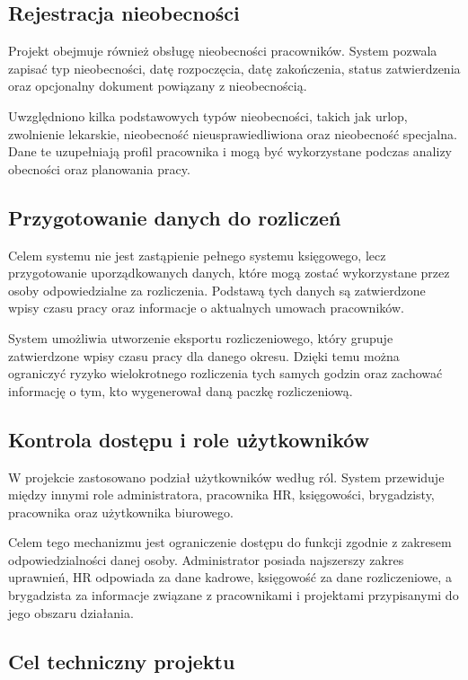 \subsection{Rejestracja nieobecności}

Projekt obejmuje również obsługę nieobecności pracowników. System pozwala zapisać typ nieobecności, datę rozpoczęcia, datę zakończenia, status zatwierdzenia oraz opcjonalny dokument powiązany z nieobecnością.

Uwzględniono kilka podstawowych typów nieobecności, takich jak urlop, zwolnienie lekarskie, nieobecność nieusprawiedliwiona oraz nieobecność specjalna. Dane te uzupełniają profil pracownika i mogą być wykorzystane podczas analizy obecności oraz planowania pracy.

\subsection{Przygotowanie danych do rozliczeń}

Celem systemu nie jest zastąpienie pełnego systemu księgowego, lecz przygotowanie uporządkowanych danych, które mogą zostać wykorzystane przez osoby odpowiedzialne za rozliczenia. Podstawą tych danych są zatwierdzone wpisy czasu pracy oraz informacje o aktualnych umowach pracowników.

System umożliwia utworzenie eksportu rozliczeniowego, który grupuje zatwierdzone wpisy czasu pracy dla danego okresu. Dzięki temu można ograniczyć ryzyko wielokrotnego rozliczenia tych samych godzin oraz zachować informację o tym, kto wygenerował daną paczkę rozliczeniową.

\subsection{Kontrola dostępu i role użytkowników}

W projekcie zastosowano podział użytkowników według ról. System przewiduje między innymi role administratora, pracownika HR, księgowości, brygadzisty, pracownika oraz użytkownika biurowego.

Celem tego mechanizmu jest ograniczenie dostępu do funkcji zgodnie z zakresem odpowiedzialności danej osoby. Administrator posiada najszerszy zakres uprawnień, HR odpowiada za dane kadrowe, księgowość za dane rozliczeniowe, a brygadzista za informacje związane z pracownikami i projektami przypisanymi do jego obszaru działania.

\subsection{Cel techniczny projektu}

